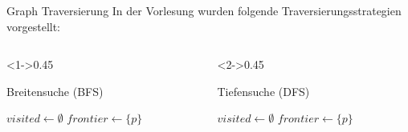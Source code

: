 \begin{frame}{Graph Traversierung}
In der Vorlesung wurden folgende Traversierungsstrategien vorgestellt:

\begin{columns}[T]
\begin{column}<1->{0.45\textwidth}
\begin{algorithm}[H]
	\caption{Breitensuche (BFS)}
	\label{trees:alg:bfs}
	\DontPrintSemicolon
    $visited \gets \emptyset$\;
    $frontier \gets \{ p \}$\;
\end{algorithm}
\end{column}
\begin{column}<2->{0.45\textwidth}
\begin{algorithm}[H]
	\caption{Tiefensuche (DFS)}
	\label{trees:alg:dfs}
	\DontPrintSemicolon
    $visited \gets \emptyset$\;
    $frontier \gets \{ p \}$\;
\end{algorithm}
\end{column}
\end{columns}
\end{frame}


